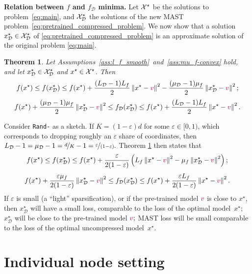 \documentclass{article}
\newcommand{\rnd}[1]{{\texttt{Rand-}}#1}
\newcommand{\cX}{{\cal X}}
\newcommand{\shift}{{\color{purple}s}}
\newcommand{\norm}[1]{\left\| #1 \right\|}
\newcommand{\cD}{\mathcal{D}}
\newtheorem{theorem}{Theorem}
\theoremstyle{plain}
\newcommand{\tf}{f_{\mathcal{D}}}
\renewcommand{\shift}{{\color{purple}v}}
\theoremstyle{plain}
\theoremstyle{definition}
\theoremstyle{remark}
\begin{document}
\textbf{Relation between $f$ and $\tf$ minima.} Let $\cX^\star$ be the solutions to problem~\ref{eq:main}, and $\cX^\star_{\mathcal{D}}$ the solutions of the new MAST problem~\eqref{eq:pretrained_compressed_problem}.
We now show that a solution $x_\cD^\star\in \cX_\cD^\star$ of \eqref{eq:pretrained_compressed_problem} is an approximate solution of the original problem \eqref{eq:main}.
\begin{theorem} \label{thm:approx} Let Assumptions~\ref{ass:l_f_smooth}~and~\ref{ass:mu_f-convex} hold, and let $x_\cD^\star \in \cX_\cD^\star$ and $x^\star \in \cX^\star$. Then
	\begin{align*}
		f(x^\star) \leq f(x_\cD^\star) \leq f(x^\star) + \frac{(L_{\mathcal{D}}-1)L_f}{2}\norm{x^\star-\shift}^2
		 - \frac{(\mu_{\mathcal{D}}-1)\mu_f}{2}\norm{x_\cD^\star-\shift}^2;
	\end{align*}
	\begin{align*}
		f(x^\star) +
		\frac{(\mu_{\mathcal{D}}-1)\mu_f}{2}\norm{x_\cD^\star-\shift}^2
		\leq \tf(x_\cD^\star)
		\leq f(x^\star)
		+ \frac{(L_{\mathcal{D}}-1)L_f}{2}\norm{x^\star-\shift}^2.
	\end{align*}
\end{theorem}

Consider \rnd{} as a sketch.
If $K = (1 - \varepsilon) d$ for some $\varepsilon \in [0, 1)$, which corresponds to dropping roughly an $\varepsilon$ share of coordinates, then $L_{\mathcal{D}}-1 = \mu_{\mathcal{D}}-1 = \nicefrac{d}{K}-1 = \nicefrac{\varepsilon}{(1-\varepsilon)}.$ Theorem \ref{thm:approx} then states that
$$
	f(x^\star) \leq f(x_\cD^\star) \leq f(x^\star) + \frac{\varepsilon}{2(1-\varepsilon)} \left(L_f \norm{x^\star-\shift}^2 - \mu_f \norm{x_\cD^\star-\shift}^2\right);
$$
$$
	f(x^\star) +
	\frac{\varepsilon\mu_f}{2(1-\varepsilon)}\norm{x_\cD^\star-\shift}^2
	\leq \tf(x_\cD^\star)\leq f(x^\star)
	+ \frac{\varepsilon L_f}{2(1-\varepsilon)}\norm{x^\star-\shift}^2.
$$
If $\varepsilon$ is small (a ``light'' sparsification), or if the pre-trained model $\shift$ is close to $x^\star$, then  $x_\cD^\star$ will have a small loss, comparable to the loss of the optimal model~$x^\star;$ $x_\cD^\star$ will be close to the pre-trained model $\shift;$ MAST loss will be small comparable to the loss of the optimal uncompressed model~$x^\star.$


\section{Individual node setting} \label{sec:convergence}
\end{document}
